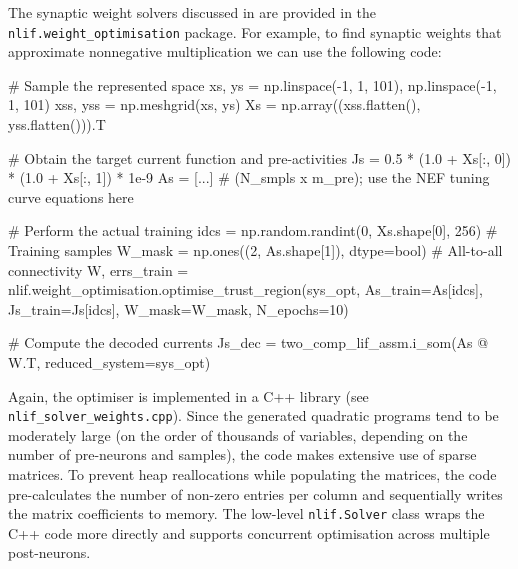 The synaptic weight solvers discussed in  are provided in the \texttt{nlif.weight\_optimisation} package.
For example, to find synaptic weights that approximate nonnegative multiplication we can use the following code:
\begin{pythoncode}
# Sample the represented space
xs, ys = np.linspace(-1, 1, 101), np.linspace(-1, 1, 101)
xss, yss = np.meshgrid(xs, ys)
Xs = np.array((xss.flatten(), yss.flatten())).T

# Obtain the target current function and pre-activities
Js = 0.5 * (1.0 + Xs[:, 0]) * (1.0 + Xs[:, 1]) * 1e-9
As = [...] # (N_smpls x m_pre); use the NEF tuning curve equations here

# Perform the actual training
idcs = np.random.randint(0, Xs.shape[0], 256)  # Training samples
W_mask = np.ones((2, As.shape[1]), dtype=bool) # All-to-all connectivity
W, errs_train = nlif.weight_optimisation.optimise_trust_region(sys_opt,
    As_train=As[idcs], Js_train=Js[idcs], W_mask=W_mask, N_epochs=10)

# Compute the decoded currents
Js_dec = two_comp_lif_assm.i_som(As @ W.T, reduced_system=sys_opt)
\end{pythoncode}
Again, the optimiser is implemented in a C++ library (see \texttt{nlif\_solver\_weights.cpp}).
Since the generated quadratic programs tend to be moderately large (on the order of thousands of variables, depending on the number of pre-neurons and samples), the code makes extensive use of sparse matrices.
To prevent heap reallocations while populating the matrices, the code pre-calculates the number of non-zero entries per column and sequentially writes the matrix coefficients to memory.
The low-level \texttt{nlif.Solver} class wraps the C++ code more directly and supports concurrent optimisation across multiple post-neurons.

